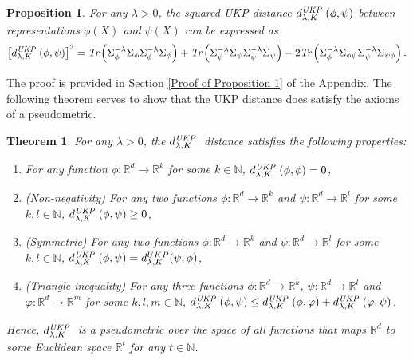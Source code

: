 \documentclass[11pt]{article}
\newcommand{\R}{\mathbb{R}}
\newcommand{\N}{\mathbb{N}}
\newcommand{\repone}{\phi}
\newcommand{\reptwo}{\psi}
\newcommand{\repthree}{\varphi}
\newcommand{\metricstname}{UKP }
\theoremstyle{plain}
\newcounter{theoremno}
\newcounter{propositionno}
\newtheorem{theorem}[theoremno]{Theorem}
\newtheorem{proposition}[propositionno]{Proposition}
\begin{document}
\begin{proposition}\label{Proposition: Squared pseudometric using trace operators}
    For any $\lambda>0$, the squared \emph{\metricstname} distance $d_{\lambda,K}^{\emph{\metricstname}}(\repone,\reptwo)$ between representations $\repone(X)$ and $\reptwo(X)$ can be expressed as
    \[
\begin{aligned}
        \left[d_{\lambda,K}^{\emph{\metricstname}}(\repone,\reptwo)\right]^{2}
        = \emph{Tr}\left(\Sigma_{\repone}^{-\lambda}\Sigma_{\repone}\Sigma_{\repone}^{-\lambda}\Sigma_{\repone}\right) + \emph{Tr}\left(\Sigma_{\reptwo}^{-\lambda}\Sigma_{\reptwo}\Sigma_{\reptwo}^{-\lambda}\Sigma_{\reptwo}\right)-2\emph{Tr}\left(\Sigma_{\repone}^{-\lambda}\Sigma_{\repone\reptwo}\Sigma_{\reptwo}^{-\lambda}\Sigma_{\reptwo\repone}\right).
    \end{aligned}
    \]
\end{proposition}

The proof is provided in Section \ref{Proof of Proposition 1} of the Appendix. The following theorem serves to show that the \metricstname distance does satisfy the axioms of a pseudometric.

\begin{theorem}\label{Theorem: Pseudometric}
    For any $\lambda>0$, the $d_{\lambda,K}^{\emph{\metricstname}}$ distance satisfies the following properties:
    \begin{enumerate}
        \item For any function $\repone: \R^d \to \R^k$ for some $k \in \N$, $d_{\lambda,K}^{\emph{\metricstname}}(\repone,\repone) = 0$,
        \item (Non-negativity) For any two functions $\repone: \R^d \to \R^k$ and $\reptwo: \R^d \to \R^l$ for some $k,l \in \N$, $d_{\lambda,K}^{\emph{\metricstname}}(\repone,\reptwo) \geq 0$,
        \item (Symmetric) For any two functions $\repone: \R^d \to \R^k$ and $\reptwo: \R^d \to \R^l$ for some $k,l \in \N$, $d_{\lambda,K}^{\emph{\metricstname}}(\repone,\reptwo) = d_{\lambda,K}^{\metricstname}(\reptwo,\repone)$,
        \item (Triangle inequality) For any three functions $\repone: \R^d \to \R^k$, $\reptwo: \R^d \to \R^l$ and $\repthree: \R^d \to \R^m$ for some $k,l,m \in \N$, $d_{\lambda,K}^{\emph{\metricstname}}(\repone,\reptwo) \leq d_{\lambda,K}^{\emph{\metricstname}}(\repone,\repthree) + d_{\lambda,K}^{\emph{\metricstname}}(\repthree,\reptwo)$.
    \end{enumerate}
    Hence, $d_{\lambda,K}^{\emph{\metricstname}}$ is a pseudometric over the space of all functions that maps $\R^d$ to some Euclidean space $\R^t$ for any $t \in \N$.
\end{theorem}
\end{document}
